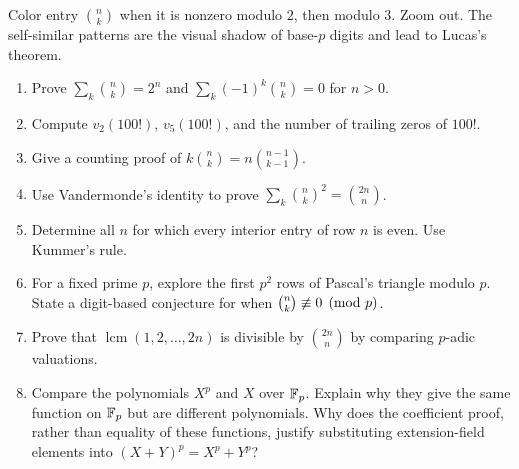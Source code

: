 \begin{labbox}
Color entry $\binom nk$ when it is nonzero modulo $2$, then modulo $3$. Zoom out. The self-similar patterns are the visual shadow of base-$p$ digits and lead to Lucas's theorem.
\end{labbox}

\begin{exercisebox}
\begin{enumerate}
  \item Prove $\sum_k\binom nk=2^n$ and $\sum_k(-1)^k\binom nk=0$ for $n>0$. 
  \item Compute $v_2(100!)$, $v_5(100!)$, and the number of trailing zeros of $100!$. 
  \item Give a counting proof of $k\binom nk=n\binom{n-1}{k-1}$. 
  \item Use Vandermonde's identity to prove $\sum_k\binom nk^2=\binom{2n}{n}$. 
  \item Determine all $n$ for which every interior entry of row $n$ is even. Use Kummer's rule. 
  \item For a fixed prime $p$, explore the first $p^2$ rows of Pascal's triangle modulo $p$. State a digit-based conjecture for when $\binom nk\not\equiv0\pmod p$. 
  \item Prove that $\operatorname{lcm}(1,2,\dots,2n)$ is divisible by $\binom{2n}{n}$ by comparing $p$-adic valuations. 
  \item Compare the polynomials $X^p$ and $X$ over $\mathbb F_p$. Explain why
  they give the same function on $\mathbb F_p$ but are different polynomials.
  Why does the coefficient proof, rather than equality of these
  functions, justify substituting extension-field elements into
  $(X+Y)^p=X^p+Y^p$? 
\end{enumerate}
\end{exercisebox}
